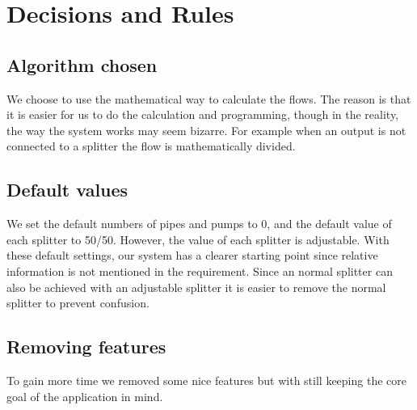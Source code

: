 \chapter{Decisions and Rules}
\section{Algorithm chosen}
\label{sec:algch}	
We choose to use the mathematical way to calculate the flows. The reason is that it is easier for us to do the calculation and programming, though in the reality, the way the system works may seem bizarre. For example when an output is not connected to a splitter the flow is mathematically divided.

\section{Default values}
\label{sec:defv}
We set the default numbers of pipes and pumps to 0, and the default value of each splitter to 50/50. However, the value of each splitter is adjustable. With these default settings, our system has a clearer starting point since relative information is not mentioned in the requirement. Since an normal splitter can also be achieved with an adjustable splitter it is easier to remove the normal splitter to prevent confusion.

\section{Removing features}
\label{sec:rem}
To gain more time we removed some nice features but with still keeping the core goal of the application in mind.
